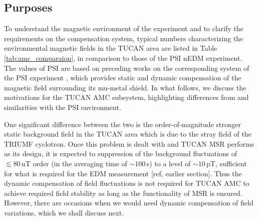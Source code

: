 



\subsection{Purposes}

To understand the magnetic environment of the experiment and to clarify the requirements on the compensation system, typical numbers characterizing the environmental magnetic fields in the TUCAN area are listed in Table \ref{tab:amc_comparaion}, in comparison to those of the PSI nEDM experiment.
The values of PSI are based on preceding works on the corresponding system of the PSI experiment \cite{Afach2014}, which provides static and dynamic compensation of the magnetic field surrounding its mu-metal shield. In what follows, we discuss the motivations for the TUCAN AMC subsystem, highlighting differences from and similarities with the PSI environment.

One significant difference between the two is the order-of-magnitude stronger static background field in the TUCAN area which is due to the stray field of the TRIUMF cyclotron. Once this problem is dealt with and TUCAN MSR performs as its design, it is expected to suppression of the background fluctuations of $\lesssim 80\,$nT order (in the averaging time of $\sim 100\,$s) to a level of $\sim10\,$pT, sufficient for what is required for the EDM measurement [ref, earlier section]. Thus the dynamic compensation of field fluctuations is not required for TUCAN AMC to achieve required field stability as long as the functionality of MSR is ensured. However, there are occasions when we would need dynamic compensation of field variations, which we shall discuss next. 

